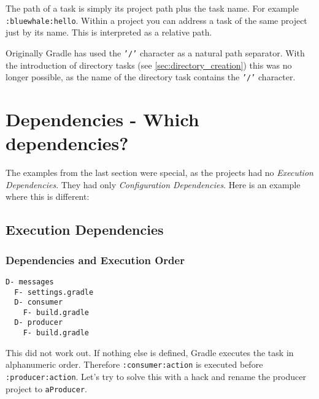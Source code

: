 The path of a task is simply its project path plus the task name. For example \texttt{:bluewhale:hello}. Within a project you can address a task of the same project just by its name. This is interpreted as a relative path.

Originally Gradle has used the \texttt{'/'} character as a natural path separator. With the introduction of directory tasks (see \ref{sec:directory_creation}) this was no longer possible, as the name of the directory task contains the \texttt{'/'} character.

\section{Dependencies - Which dependencies?} %
\label{sec:dependencies_which_dependencies}
The examples from the last section were special, as the projects had no \emph{Execution Dependencies}. They had only \emph{Configuration Dependencies}. Here is an example where this is different:

\subsection{Execution Dependencies} %
\label{sub:execution_time_dependencies}

\subsubsection{Dependencies and Execution Order} %
\label{ssub:dependencies_and_execution_order}

\begin{minipage}[t]{7cm}
\begin{Verbatim}[frame=single,label=Project Tree]
D- messages
  F- settings.gradle
  D- consumer
    F- build.gradle
  D- producer
    F- build.gradle
\end{Verbatim}
\end{minipage}	
\begin{minipage}[t]{9cm}
\end{minipage}

This did not work out. If nothing else is defined, Gradle executes the task in alphanumeric order. Therefore \texttt{:consumer:action} is executed before \texttt{:producer:action}. Let's try to solve this with a hack and rename the producer project to \texttt{aProducer}.

